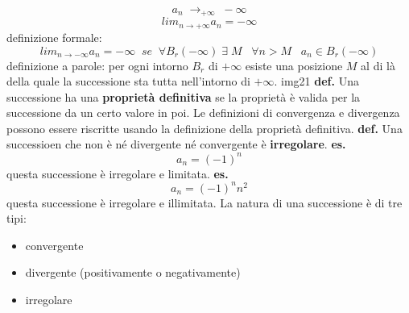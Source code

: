 \[
    a_n \; \rightarrow_{+ \infty} \; - \infty
\]
\[
    lim_{n\rightarrow +\infty} a_n = - \infty
\]
\newline
definizione formale:
\[
    lim_{n\rightarrow - \infty} a_n = -\infty \;\;se\;\; \forall B_r(-\infty) \;\exists \; M \;\;\; \forall n>M \;\;\; a_n \in B_r(-\infty)
\]
definizione a parole:
\newline
per ogni intorno $B_r$ di $+\infty$ esiste una posizione $M$ al di là della quale la successione sta tutta nell'intorno di $+\infty$.
\newline
img21
\newline
\newline
\textbf{def.} Una successione ha una \textbf{proprietà definitiva} se la proprietà è valida per la successione da un certo valore in poi.
\newline
Le definizioni di convergenza e divergenza possono essere riscritte usando la definizione della proprietà definitiva.
\newline
\textbf{def.} Una successioen che non è né divergente né convergente è \textbf{irregolare}.
\newline
\textbf{es.}
\[
    a_n = (-1)^n
\]
questa successione è irregolare e limitata.
\textbf{es.}
\[
    a_n = (-1)^nn^2
\]
questa successione è irregolare e illimitata.
\newline
\newline
La natura di una successione è di tre tipi:
\begin{itemize}
    \item convergente
    \item divergente (positivamente o negativamente)
    \item irregolare
\end{itemize}




